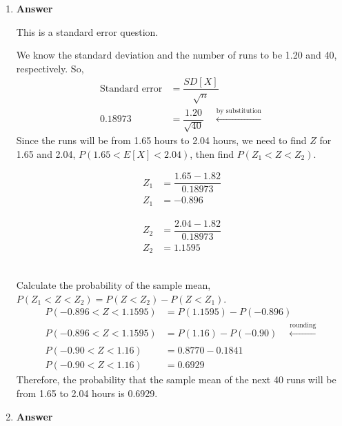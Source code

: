 \documentclass[12pt]{book}
\begin{document}
\begin{enumerate}
    \newpage
    \item \textbf{Answer}
    
    This is a standard error question.
    
    We know the standard deviation and the number of runs to be 1.20 and 40, respectively. So,
    \begin{align*}
        \text{Standard error} &= \dfrac{SD[X]}{\sqrt{n}}\\
        0.18973 &= \dfrac{1.20}{\sqrt{40}} \quad \xleftarrow[]{\text{by substitution}}
    \end{align*}
    Since the runs will be from 1.65 hours to 2.04 hours, we need to find $Z$ for 1.65 and 2.04, $P(1.65 < E[X] < 2.04)$, then find $P(Z_1 < Z < Z_2)$.

    \begin{minipage}{0.45\textwidth}
        \begin{align*}
            Z_1 &= \dfrac{1.65 - 1.82}{0.18973}\\
            Z_1 &= -0.896
        \end{align*}
    \end{minipage}
    \begin{minipage}{0.45\textwidth}
        \begin{align*}
            Z_2 &= \dfrac{2.04 - 1.82}{0.18973}\\
            Z_2 &= 1.1595
        \end{align*}
    \end{minipage}\\
    
    Calculate the probability of the sample mean, $P(Z_1 < Z < Z_2) = P(Z < Z_2) - P(Z < Z_1)$.
    \begin{align*}
        P(-0.896 < Z < 1.1595) &= P(1.1595) - P(-0.896)\\
        P(-0.896 < Z < 1.1595) &= P(1.16) - P(-0.90) \quad \xleftarrow[]{\text{rounding}}\\
        P(-0.90 < Z < 1.16) &= 0.8770 - 0.1841\\
        P(-0.90 < Z < 1.16) &= 0.6929
    \end{align*}
    Therefore, the probability that the sample mean of the next 40 runs will be from 1.65 to 2.04 hours is 0.6929.
    
    \newpage
    \item \textbf{Answer}
    

\end{enumerate}
\end{document}
